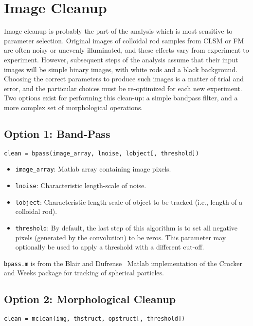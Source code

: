 \section{Image Cleanup}

Image cleanup is probably the part of the analysis which is most sensitive to parameter selection.
Original images of colloidal rod samples from CLSM or FM are often noisy or unevenly illuminated, and these
effects vary from experiment to experiment.  However, subsequent steps of the analysis assume that their input
images will be simple binary images, with white rods and a black background. Choosing the correct parameters 
to produce such images is a matter of trial and error, and the particular choices must be re-optimized
for each new experiment.  Two options exist for performing this clean-up: a simple bandpass filter, 
and a more complex set of morphological operations.

\subsection{Option 1: Band-Pass}

\texttt{clean = bpass(image\_array, lnoise, lobject[, threshold])}

\begin{itemize}
\item \texttt{image\_array}: Matlab array containing image pixels.
\item \texttt{lnoise}: Characteristic length-scale of noise.
\item \texttt{lobject}: Characteristic length-scale of object to be tracked (i.e., length of a colloidal rod).
\item \texttt{threshold}: By default, the last step of this algorithm is to set all negative pixels (generated
by the convolution) to be zeros. This parameter may optionally be used to apply a threshold with a different cut-off.
\end{itemize}

\texttt{bpass.m} is from the Blair and Dufrense~\cite{blair-dufrense-matlab} Matlab implementation of the Crocker and Weeks
package for tracking of spherical particles.~\cite{crocker-grier-spheres}

\subsection{Option 2: Morphological Cleanup}

\texttt{clean = mclean(img, thstruct, opstruct[, threshold])}

